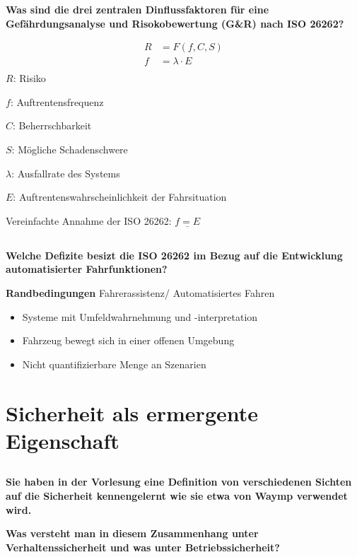 \textbf{Was sind die drei zentralen Dinflussfaktoren für eine Gefährdungsanalyse und Risokobewertung (G\&R) nach ISO 26262?}

\begin{equation}
    \begin{array}{cc}
        R & =F(f,C,S)       \\
        f & =\lambda\cdot E \\
    \end{array}
\end{equation}
$R$: Risiko

$f$: Auftrentensfrequenz

$C$: Beherrschbarkeit

$S$: Mögliche Schadenschwere

$\lambda$: Ausfallrate des Systems

$E$: Auftrentenswahrscheinlichkeit der Fahrsituation

Vereinfachte Annahme der ISO 26262: $\underline{f=E}$

\subsection{}
\textbf{Welche Defizite besizt die ISO 26262 im Bezug auf die Entwicklung automatisierter Fahrfunktionen?}

\textbf{Randbedingungen} Fahrerassistenz/ Automatisiertes Fahren
\begin{itemize}
    \item Systeme mit Umfeldwahrnehmung und -interpretation
    \item Fahrzeug bewegt sich in einer offenen Umgebung
    \item Nicht quantifizierbare Menge an Szenarien
\end{itemize}

\section{Sicherheit als ermergente Eigenschaft}
\subsection{}
\textbf{Sie haben in der Vorlesung eine Definition von verschiedenen Sichten auf die Sicherheit kennengelernt wie sie etwa von Waymp verwendet wird.}

\textbf{Was versteht man in diesem Zusammenhang unter Verhaltenssicherheit und was unter Betriebssicherheit?}